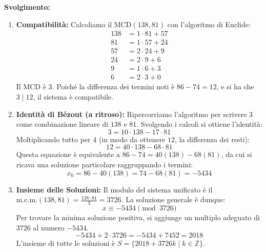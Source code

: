 \documentclass[12pt, a4paper]{article}
\begin{document}
\textbf{Svolgimento:}
\begin{enumerate}
    \item \textbf{Compatibilità:} Calcoliamo il $\text{MCD}(138, 81)$ con l'algoritmo di Euclide:
    \begin{align*}
        138 &= 1 \cdot 81 + 57 \\
        81 &= 1 \cdot 57 + 24 \\
        57 &= 2 \cdot 24 + 9 \\
        24 &= 2 \cdot 9 + 6 \\
        9 &= 1 \cdot 6 + 3 \\
        6 &= 2 \cdot 3 + 0
    \end{align*}
    Il $\text{MCD}$ è $3$. Poiché la differenza dei termini noti è $86 - 74 = 12$, e si ha che $3 \mid 12$, il sistema è compatibile.
    
    \item \textbf{Identità di Bézout (a ritroso):}
    Ripercorriamo l'algoritmo per scrivere $3$ come combinazione lineare di $138$ e $81$. Svolgendo i calcoli si ottiene l'identità:
    \[ 3 = 10 \cdot 138 - 17 \cdot 81 \]
    Moltiplicando tutto per $4$ (in modo da ottenere $12$, la differenza dei resti):
    \[ 12 = 40 \cdot 138 - 68 \cdot 81 \]
    Questa equazione è equivalente a $86 - 74 = 40(138) - 68(81)$, da cui si ricava una soluzione particolare raggruppando i termini:
    \[ x_0 = 86 - 40(138) = 74 - 68(81) = -5434 \]
    
    \item \textbf{Insieme delle Soluzioni:}
    Il modulo del sistema unificato è il $\text{m.c.m.}(138, 81) = \frac{138 \cdot 81}{3} = 3726$.
    La soluzione generale è dunque:
    \[ x \equiv -5434 \pmod{3726} \]
    Per trovare la minima soluzione positiva, si aggiunge un multiplo adeguato di $3726$ al numero $-5434$.
    \[ -5434 + 2 \cdot 3726 = -5434 + 7452 = 2018 \]
    L'insieme di tutte le soluzioni è $S = \{ 2018 + 3726k \mid k \in \mathbb{Z} \}$.
\end{enumerate}
\end{document}
